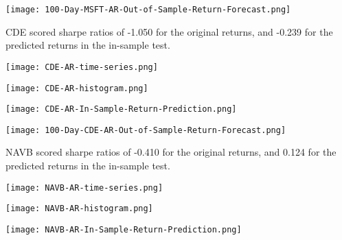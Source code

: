 \begin{center}
    \texttt{[image: 100-Day-MSFT-AR-Out-of-Sample-Return-Forecast.png]}
    \label{fig:nonfloat}
\end{center}

CDE scored sharpe ratios of -1.050 for the original returns, and -0.239 for the predicted returns in the in-sample test.

\begin{center}
    \texttt{[image: CDE-AR-time-series.png]}
    \label{fig:nonfloat}
\end{center}

\begin{center}
    \texttt{[image: CDE-AR-histogram.png]}
    \label{fig:nonfloat}
\end{center}

\begin{center}
    \texttt{[image: CDE-AR-In-Sample-Return-Prediction.png]}
    \label{fig:nonfloat}
\end{center}

\begin{center}
    \texttt{[image: 100-Day-CDE-AR-Out-of-Sample-Return-Forecast.png]}
    \label{fig:nonfloat}
\end{center}

NAVB scored sharpe ratios of -0.410 for the original returns, and 0.124 for the predicted returns in the in-sample test.

\begin{center}
    \texttt{[image: NAVB-AR-time-series.png]}
    \label{fig:nonfloat}
\end{center}

\begin{center}
    \texttt{[image: NAVB-AR-histogram.png]}
    \label{fig:nonfloat}
\end{center}

\begin{center}
    \texttt{[image: NAVB-AR-In-Sample-Return-Prediction.png]}
    \label{fig:nonfloat}
\end{center}


